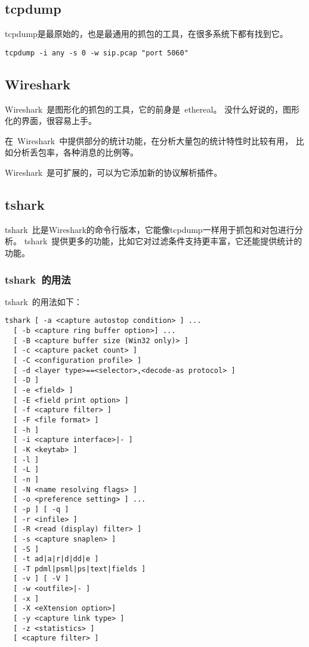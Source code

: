 \subsection{tcpdump}
tcpdump是最原始的，也是最通用的抓包的工具，在很多系统下都有找到它。

\begin{lstlisting}
tcpdump -i any -s 0 -w sip.pcap "port 5060"
\end{lstlisting}

\subsection{Wireshark}
\label{sec:wireshark}

Wireshark~是图形化的抓包的工具，它的前身是~ethereal。
没什么好说的，图形化的界面，很容易上手。

在~Wireshark~中提供部分的统计功能，在分析大量包的统计特性时比较有用，
比如分析丢包率，各种消息的比例等。

Wireshark~是可扩展的，可以为它添加新的协议解析插件。

\subsection{tshark}

tshark~比是Wireshark的命令行版本，它能像tcpdump一样用于抓包和对包进行分析。
tshark~提供更多的功能，比如它对过滤条件支持更丰富，它还能提供统计的功能。

\subsubsection{tshark~的用法}

tshark~的用法如下：

\begin{lstlisting}
tshark [ -a <capture autostop condition> ] ...
  [ -b <capture ring buffer option>] ...
  [ -B <capture buffer size (Win32 only)> ]
  [ -c <capture packet count> ]
  [ -C <configuration profile> ]
  [ -d <layer type>==<selector>,<decode-as protocol> ]
  [ -D ]
  [ -e <field> ]
  [ -E <field print option> ]
  [ -f <capture filter> ]
  [ -F <file format> ]
  [ -h ]
  [ -i <capture interface>|- ]
  [ -K <keytab> ]
  [ -l ]
  [ -L ]
  [ -n ]
  [ -N <name resolving flags> ]
  [ -o <preference setting> ] ...
  [ -p ] [ -q ]
  [ -r <infile> ]
  [ -R <read (display) filter> ]
  [ -s <capture snaplen> ]
  [ -S ]
  [ -t ad|a|r|d|dd|e ]
  [ -T pdml|psml|ps|text|fields ]
  [ -v ] [ -V ]
  [ -w <outfile>|- ]
  [ -x ]
  [ -X <eXtension option>]
  [ -y <capture link type> ]
  [ -z <statistics> ]
  [ <capture filter> ]
\end{lstlisting}

